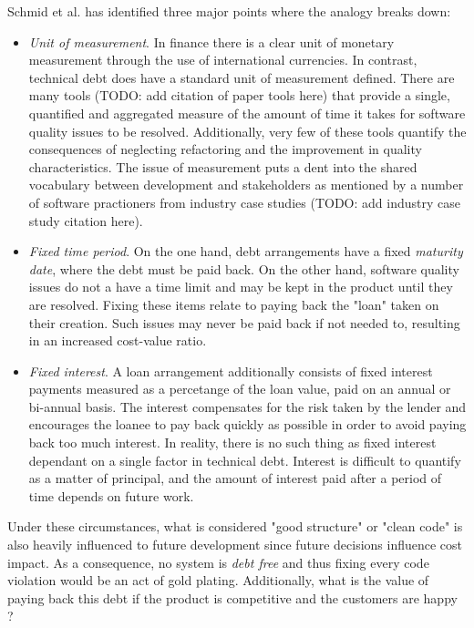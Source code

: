 \documentclass{mprop}
\begin{document}
Schmid et al. \cite{Schmid2013} has identified three major points where the analogy breaks down:
\begin{itemize}
	\item \textit{Unit of measurement}. In finance there is a clear unit of monetary measurement through the use of international currencies.
	      In contrast, technical debt does have a standard unit of measurement defined.
	      There are many tools (TODO: add citation of paper tools here) that provide a single, quantified and aggregated measure of the amount of time it takes for software quality issues to be resolved.
	      Additionally, very few of these tools quantify the consequences of neglecting refactoring and the improvement in quality characteristics.
	      The issue of measurement puts a dent into the shared vocabulary between development and stakeholders as mentioned by a number of software practioners from industry case studies (TODO: add industry case study citation here).
	\item \textit{Fixed time period}. On the one hand, debt arrangements have a fixed \textit{maturity date}, where the debt must be paid back.
	      On the other hand, software quality issues do not a have a time limit and may be kept in the product until they are resolved.
	      Fixing these items relate to paying back the "loan" taken on their creation.
	      Such issues may never be paid back if not needed to, resulting in an increased cost-value ratio.
	\item \textit{Fixed interest}. A loan arrangement additionally consists of fixed interest payments measured as a percetange of the loan value, paid on an annual or bi-annual basis.
	      The interest compensates for the risk taken by the lender and encourages the loanee to pay back quickly as possible in order to avoid paying back too much interest.
	      In reality, there is no such thing as fixed interest dependant on a single factor in technical debt.
	      Interest is difficult to quantify as a matter of principal, and the amount of interest paid after a period of time depends on future work.
\end{itemize}
Under these circumstances, what is considered "good structure" or "clean code" is also heavily influenced to future development since future decisions influence cost impact.
As a consequence, no system is \textit{debt free} and thus fixing every code violation would be an act of gold plating.
Additionally, what is the value of paying back this debt if the product is competitive and the customers are happy \cite{Lim2012}?
\end{document}
